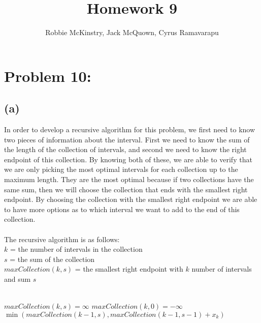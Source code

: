 \documentclass[12pt]{article}
\begin{document}
\title{Homework 9}
\author{Robbie McKinstry, Jack McQuown, Cyrus Ramavarapu}
\renewcommand{\today}{23 September 2016}
\renewcommand{\baselinestretch}{1.5}
\maketitle

\section*{Problem 10: }
\subsection*{(a)}
In order to develop a recursive algorithm for this problem, we first need to know two pieces of information about the interval. First we need to know the sum of the length of the collection of intervals, and second we need to know the right endpoint of this collection. By knowing both of these, we are able to verify that we are only picking the most optimal intervals for each collection up to the maximum length. They are the most optimal because if two collections have the same sum, then we will choose the collection that ends with the smallest right endpoint. By choosing the collection with the smallest right endpoint we are able to have more options as to which interval we want to add to the end of this collection.\\\\
The recursive algorithm is as follows:\\
$k$ = the number of intervals in the collection\\
$s$ = the sum of the collection\\
$maxCollection(k, s)$ = the smallest right endpoint with $k$ number of intervals and sum $s$\\
\begin{algorithm}[H]
\Init\\
{
{$maxCollection(k, s) = \infty$}
}
{$maxCollection(k, 0) = -\infty$}
\EndInit\\
{
{
{$\min(maxCollection(k - 1, s), maxCollection(k - 1, s - 1) + x_k)$}
}
}
\end{algorithm}
\end{document}
